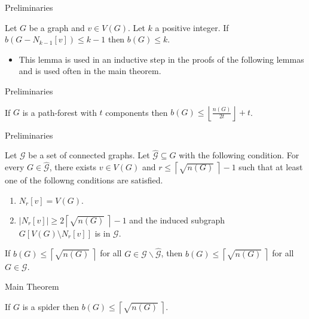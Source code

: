 \documentclass{beamer}
\begin{document}
\begin{frame}{Preliminaries}
    \begin{lemma}
        Let $G$ be a graph and $v \in V(G)$. Let $k$ a positive integer.
        If $b(G - N_{k-1}[v]) \leq k - 1$ then $b(G) \leq k$.
    \end{lemma}
\begin{itemize}
\item This lemma is used in an inductive step in the proofs of the following lemmas and is used often in the main theorem.
\end{itemize}
\end{frame}

\begin{frame}{Preliminaries}
    \begin{lemma}
        If $G$ is a path-forest with $t$ components then $b(G) \leq \left\lfloor \frac{n(G)}{2t} \right\rfloor + t$.
    \end{lemma}
\end{frame}

\begin{frame}{Preliminaries}
    \begin{lemma}
        Let $\mathcal{G}$ be a set of connected graphs.
        Let $\hat{\mathcal{G}} \subseteq G$ with the following condition.
        For every $G \in \hat{\mathcal{G}}$, there exists $v \in V(G)$ and $r \leq \left\lceil \sqrt{n(G)}\ \right\rceil - 1$ such that at least one of the followng conditions are satisfied.
        \begin{enumerate}
            \item $N_r[v] = V(G).$
            \item $|N_r[v]| \geq 2 \left\lceil \sqrt{n(G)}\ \right\rceil - 1$ and the induced subgraph\\ $G[V(G) \setminus N_r[v]]$ is in  $\mathcal{G}$.
        \end{enumerate}
        If $b(G) \leq \left\lceil \sqrt{n(G)}\ \right\rceil$ for all $G \in \mathcal{G} \backslash \hat{\mathcal{G}}$, then $b(G) \leq \left\lceil \sqrt{n(G)}\ \right\rceil$ for all $G \in \mathcal{G}$.
    \end{lemma}
\end{frame}

\begin{frame}{Main Theorem}
    \begin{theorem}
        If $G$ is a spider then $b(G) \leq \left\lceil \sqrt{n(G)}\ \right\rceil$.
    \end{theorem}
\end{frame}
\end{document}
